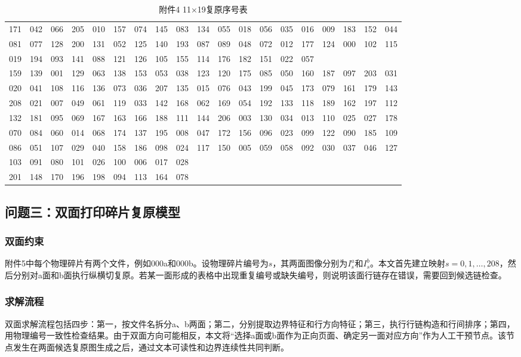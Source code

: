 \documentclass[UTF8,a4paper,12pt]{ctexart}
\begin{document}
\begin{longtable}{*{19}{c}}\caption{附件4 11×19复原序号表}\label{tab:q2b}\\\toprule
171 & 042 & 066 & 205 & 010 & 157 & 074 & 145 & 083 & 134 & 055 & 018 & 056 & 035 & 016 & 009 & 183 & 152 & 044 \\
081 & 077 & 128 & 200 & 131 & 052 & 125 & 140 & 193 & 087 & 089 & 048 & 072 & 012 & 177 & 124 & 000 & 102 & 115 \\
019 & 194 & 093 & 141 & 088 & 121 & 126 & 105 & 155 & 114 & 176 & 182 & 151 & 022 & 057 &  &  &  &  \\
159 & 139 & 001 & 129 & 063 & 138 & 153 & 053 & 038 & 123 & 120 & 175 & 085 & 050 & 160 & 187 & 097 & 203 & 031 \\
020 & 041 & 108 & 116 & 136 & 073 & 036 & 207 & 135 & 015 & 076 & 043 & 199 & 045 & 173 & 079 & 161 & 179 & 143 \\
208 & 021 & 007 & 049 & 061 & 119 & 033 & 142 & 168 & 062 & 169 & 054 & 192 & 133 & 118 & 189 & 162 & 197 & 112 \\
132 & 181 & 095 & 069 & 167 & 163 & 166 & 188 & 111 & 144 & 206 & 003 & 130 & 034 & 013 & 110 & 025 & 027 & 178 \\
070 & 084 & 060 & 014 & 068 & 174 & 137 & 195 & 008 & 047 & 172 & 156 & 096 & 023 & 099 & 122 & 090 & 185 & 109 \\
086 & 051 & 107 & 029 & 040 & 158 & 186 & 098 & 024 & 117 & 150 & 005 & 059 & 058 & 092 & 030 & 037 & 046 & 127 \\
103 & 091 & 080 & 101 & 026 & 100 & 006 & 017 & 028 &  &  &  &  &  &  &  &  &  &  \\
201 & 148 & 170 & 196 & 198 & 094 & 113 & 164 & 078 &  &  &  &  &  &  &  &  &  &  \\
\bottomrule\end{longtable}

\subsection{问题三：双面打印碎片复原模型}
\subsubsection{双面约束}
附件5中每个物理碎片有两个文件，例如000a和000b。设物理碎片编号为$s$，其两面图像分别为$I^a_s$和$I^b_s$。本文首先建立映射$s=0,1,\ldots,208$，然后分别对a面和b面执行纵横切复原。若某一面形成的表格中出现重复编号或缺失编号，则说明该面行链存在错误，需要回到候选链检查。

\subsubsection{求解流程}
双面求解流程包括四步：第一，按文件名拆分a、b两面；第二，分别提取边界特征和行方向特征；第三，执行行链构造和行间排序；第四，用物理编号一致性检查结果。由于双面方向可能相反，本文将“选择a面或b面作为正向页面、确定另一面对应方向”作为人工干预节点。该节点发生在两面候选复原图生成之后，通过文本可读性和边界连续性共同判断。
\end{document}

